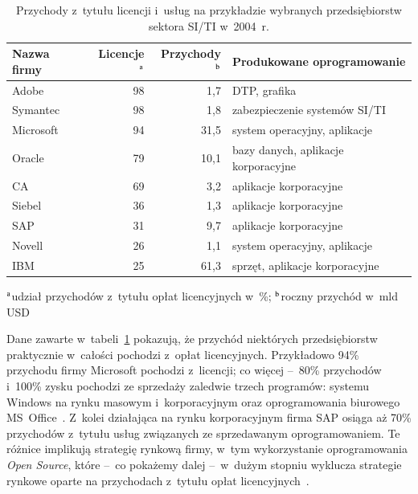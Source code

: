 \documentclass[brudnopis,xodstep]{wkmgr}
\def\SITI{SI/TI} %
\begin{document}
\begin{table}[!tbh]\small
\caption{Przychody z~tytułu licencji i~usług 
 na przykładzie wybranych przedsiębiorstw sektora {\SITI}  w~2004~r.}
\label{tab:valimaki}
\begin{tabular*}{\textwidth}{@{\extracolsep{\stretch{1}}}lrrl} \hline
Nazwa firmy & Licencje$^{\rm a}$ & Przychody$^{\rm b}$ & Produkowane oprogramowanie \\ \hline
Adobe\index{Adobe Inc.} & 98 &  1,7 & DTP, grafika \\
Symantec & 98 &  1,8 &  zabezpieczenie systemów {\SITI}\\ 
Microsoft\index{Microsoft} & 94 & 31,5 & system operacyjny, aplikacje \\ %
Oracle & 79 & 10,1 & bazy danych, aplikacje korporacyjne \\
CA & 69 &  3,2 & aplikacje korporacyjne \\ 
Siebel & 36 &  1,3 & aplikacje korporacyjne \\
SAP & 31 &  9,7 & aplikacje korporacyjne \\
Novell & 26 &  1,1 & system operacyjny, aplikacje \\
IBM & 25 & 61,3 & sprzęt, aplikacje korporacyjne \\ \hline
\end{tabular*}
\begin{footnotesize}
$^{\rm a}$udział przychodów z~tytułu opłat 
licencyjnych w~\%; $^{\rm b}$roczny przychód w~mld USD 
\end{footnotesize}
\end{table}

Dane zawarte w~tabeli~\ref{tab:valimaki} pokazują, że przychód
niektórych przedsiębiorstw praktycznie w~całości pochodzi z~opłat
licencyjnych.  Przykładowo 94\% przychodu firmy
Microsoft pochodzi z~licencji; co więcej --~80\%
przychodów i~100\% zysku pochodzi ze sprzedaży zaledwie trzech
programów: systemu Windows na rynku masowym i~korporacyjnym oraz
oprogramowania biurowego MS~Office~\cite[s.~55]{Cusumano2004}.
Z~kolei działająca na rynku korporacyjnym firma SAP osiąga aż 70\% przychodów
z~tytułu usług związanych ze sprzedawanym oprogramowaniem.
Te różnice implikują strategię rynkową firmy, w~tym wykorzystanie
oprogramowania \emph{Open Source}, które --~co pokażemy dalej
--~w~dużym stopniu wyklucza strategie rynkowe
oparte na przychodach z~tytułu 
opłat licencyjnych~\citep[s.~28]{Valimaki2005}.
\end{document}
